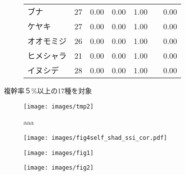 \documentclass[a0, 30pt, plainboxedsections, draft]{sciposter} %
\renewcommand{\baselinestretch}{1.2}
\begin{document}
\begin{multicols}{2}
\begin{mdframed}[style=subsection.frame,frametitle={\textbf{\huge{\ding{192}}\LARGE{25種の株構造は種間で大きく異なる}}}]
\begin{figure}
\begin{minipage}{0.5\hsize}
\begin{table}
{\begin{tabular}{llrrrr}
\rowcolor{Orange1!30}ブナ &  27 & 0.00 & 0.00 & 1.00 & 0.00 \\ 
\rowcolor{Orange1!30}ケヤキ &  27 & 0.00 & 0.00 & 1.00 & 0.00 \\ 
\rowcolor{Orange1!30}オオモミジ &  26 & 0.00 & 0.00 & 1.00 & 0.00 \\ 
\rowcolor{Orange1!30}ヒメシャラ &  21 & 0.00 & 0.00 & 1.00 & 0.00 \\ 
\rowcolor{Orange1!30}イヌシデ &  28 & 0.00 & 0.00 & 1.00 & 0.00　 \\ 
   \hline
\end{tabular}}
\end{table}
 \end{minipage}
\end{figure}


\end{mdframed}

\renewcommand{\baselinestretch}{0.8}
\begin{mdframed}[style=subsection.frame,frametitle=\textbf{\huge{\ding{194}}\LARGE{萌芽性が強い種ほど自己被陰率が下がる}}]
\renewcommand{\baselinestretch}{1.2}

複幹率５\%以上の17種を対象

\begin{figure}
 \begin{minipage}{0.3\hsize}
  \centering
   \texttt{[image: images/tmp2]}
   
   aaa
 \end{minipage}
 \begin{minipage}{0.67\hsize}
  \centering
   \texttt{[image: images/fig4self\_shad\_ssi\_cor.pdf]}   
 \end{minipage}
\end{figure}

\end{mdframed}

\columnbreak
\renewcommand{\baselinestretch}{0.8}
\begin{mdframed}[style=subsection.frame,frametitle=\textbf{\huge{\ding{193}}\LARGE{樹高が高くなるほど萌芽性が強くなる}}]
\renewcommand{\baselinestretch}{1.2} %

\begin{figure}
	\centering
		\texttt{[image: images/fig1]} %
\end{figure}

\begin{figure}
	\centering
		\texttt{[image: images/fig2]} %
\end{figure}

\end{mdframed}

\end{multicols}

\end{document}
